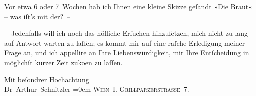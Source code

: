 \pstart
           Vor etwa 6 oder 7 Wochen hab {\pb}ich Ihnen eine kleine Skizze
               geſandt »Die Braut« – was iſt’s mit der? –\pend
           
\pstart
           – Jedenfalls will ich noch das höfliche Erſuchen hinzuſetzen, mich nicht zu lang auf
               Antwort warten zu laſſen; es kommt mir auf eine raſche Erledigung meiner Frage an,
               und ich appellire an Ihre Liebenswürdigkeit, mir Ihre Entſcheidung in möglichſt
               kurzer Zeit zu{\pb}ko{\geminationm}en zu
               laſſen.\pend
           
\pstart
           Mit beſondrer Hochachtung{\\[\baselineskip]}\spacefill\mbox{Dr Arthur Schnitzler}\pend
           \leftskip=0em{}
\pstart
           \noindent{}\textsc{Wien I. Grillparzerstraße 7}.\pend
           \endnumbering{}  
      